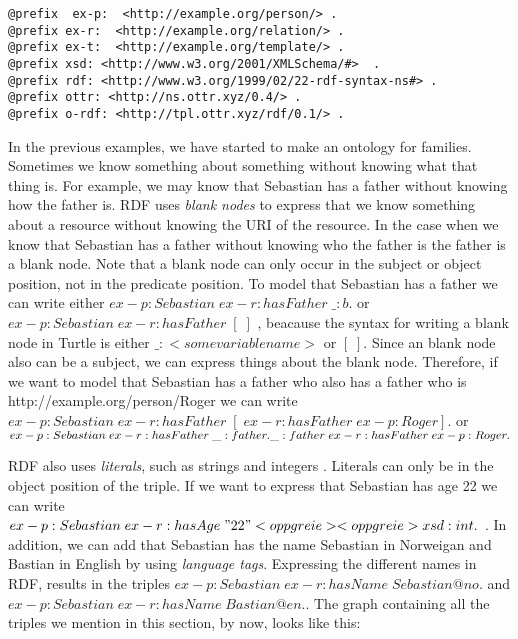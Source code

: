 \begin{lstlisting}[frame=single, language=turtle]
@prefix  ex-p:  <http://example.org/person/> . 
@prefix ex-r:  <http://example.org/relation/> . 
@prefix ex-t:  <http://example.org/template/> . 
@prefix xsd: <http://www.w3.org/2001/XMLSchema/#>  . 
@prefix rdf: <http://www.w3.org/1999/02/22-rdf-syntax-ns#> .
@prefix ottr: <http://ns.ottr.xyz/0.4/> .
@prefix o-rdf: <http://tpl.ottr.xyz/rdf/0.1/> .
\end{lstlisting}

\para
In the previous examples, we have started to make an ontology for families. Sometimes we know something about something without knowing what that thing is. For example, we may know that Sebastian has a father without knowing how the father is. RDF uses \emph{blank nodes} to express that we know something about a resource without knowing the URI of the resource. In the case when we know that Sebastian has a father without knowing who the father is the father is a blank node. Note that a blank node can only  occur in the subject or object position, not in the predicate position. To model that Sebastian has a father we can write either $ex-p:Sebastian\; ex-r:hasFather\; \_:b .$ or $ex-p:Sebastian\; ex-r:hasFather\; [\; ]$ , beacause the syntax for writing a blank node in Turtle is either $\_:<some variable name>$ or $[\; ]$. Since an blank node also can be a subject, we can express things about the blank node. Therefore, if we want to model that Sebastian has a father who also has a father who is http://example.org/person/Roger we can write $ex-p:Sebastian\; ex-r:hasFather\; [\; ex-r:hasFather\; ex-p:Roger] .$ or $ex-p:Sebastian\; ex-r:hasFather\; \_:father . \\ \_:father \; ex-r:hasFather\; ex-p:Roger .$

\para
RDF also uses \emph{literals}, such as strings and integers \autocite{W3C_RDF}. Literals can only be in the object position of the triple. If we want to express that Sebastian has age 22 we can write $ex-p:Sebastian\; ex-r:hasAge\; " 22 " <opp greie> <opp greie> xsd:int.$ . In addition, we can add that Sebastian has the name Sebastian in Norweigan and Bastian in English by using \emph{language tags}. Expressing the different names in RDF, results in the triples $ex-p:Sebastian\; ex-r:hasName\; Sebastian@no.$ and $ex-p:Sebastian\; ex-r:hasName\; Bastian@en.$. The graph containing all the triples we mention in this section, by now, looks like this:

